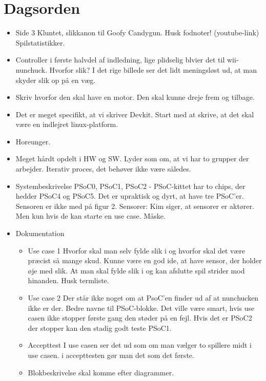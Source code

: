 \documentclass{article}
\begin{document}
	\section{Dagsorden}
	\begin{itemize}
		\item Side 3
		\subitem Kluntet, slikkanon til Goofy Candygun. Husk fodnoter! (youtube-link) 
		Spilstatistikker. 
		\item Controller i første halvdel af indledning, lige plidselig blvier det til wii-nunchuck. 
		\subitem Hvorfor slik? I det rige billede ser det lidt meningsløst ud, at man skyder slik op på en væg. 
		\item Skriv hvorfor den skal have en motor. Den skal kunne dreje frem og tilbage. 
		\item Det er meget specifikt, at vi skriver Devkit. Start med at skrive, at det skal være en indlejret linux-platform. 
		\item Horeunger. 
		\item Meget hårdt opdelt i HW og SW. Lyder som om, at vi har to grupper der arbejder. Iterativ proces, det behøver ikke være således. 
		\item Systembeskrivelse
		\subitem PSoC0, PSoC1, PSoC2 - PSoC-kittet har to chips, der hedder PSoC4 og PSoC5. 
		\subitem Det er upraktisk og dyrt, at have tre PSoC'er. 
		\subitem Sensoren er ikke med på figur 2. 
		\subitem Sensorer: Kim siger, at sensorer er aktører. Men kun hvis de kan starte en use case. Måske. 
		\item Dokumentation 
		\begin{itemize}
			\item Use case 1
			\subitem Hvorfor skal man selv fylde slik i og hvorfor skal det være præcist så mange skud. 
			\subitem Kunne være en god ide, at have sensor, der holder øje med slik. 
			\subitem At man skal fylde slik i og kan afslutte spil strider mod hinanden. 
			\subitem Husk termliste. 
			\item Use case 2
			\subitem Der står ikke noget om at PsoC'en finder ud af at nunchucken ikke er der. 
			\subitem Bedre navne til PSoC-blokke. 
			\subitem Det ville være smart, hvis use casen ikke stopper første gang den støder på en fejl. Hvis det er PSoC2 der stopper kan den stadig godt teste PSoC1. 
			\item Accepttest
			\subitem I use casen ser det ud som om man vælger to spillere midt i use casen. i accepttesten gør man det som det første. 
			\item Blokbeskrivelse skal komme efter diagrammer. 

\end{itemize}
\end{itemize}
\end{document}
